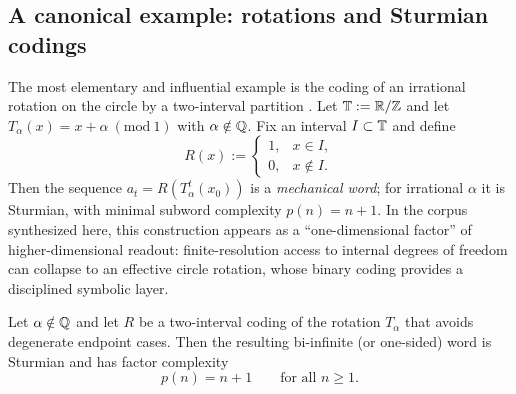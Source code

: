 \subsection{A canonical example: rotations and Sturmian codings}\label{sec:readout:sturmian}

The most elementary and influential example is the coding of an irrational rotation on the circle by a two-interval partition \cite{Queffelec2010}.
Let $\mathbb{T} := \mathbb{R}/\mathbb{Z}$ and let $T_\alpha(x)=x+\alpha \ (\mathrm{mod}\ 1)$ with $\alpha \notin \mathbb{Q}$. Fix an interval $I\subset \mathbb{T}$ and define
\[
R(x) :=
\begin{cases}
1,& x\in I,\\
0,& x\notin I.
\end{cases}
\]
Then the sequence $a_t = R(T_\alpha^t(x_0))$ is a \emph{mechanical word}; for irrational $\alpha$ it is Sturmian, with minimal subword complexity $p(n)=n+1$. In the corpus synthesized here, this construction appears as a ``one-dimensional factor'' of higher-dimensional readout: finite-resolution access to internal degrees of freedom can collapse to an effective circle rotation, whose binary coding provides a disciplined symbolic layer.

\begin{proposition}\label{prop:sturmian-complexity}
Let $\alpha\notin\mathbb{Q}$ and let $R$ be a two-interval coding of the rotation $T_\alpha$ that avoids degenerate endpoint cases. Then the resulting bi-infinite (or one-sided) word is Sturmian and has factor complexity
\[
p(n)=n+1\qquad\text{for all }n\ge 1.
\]
\cite{Queffelec2010,Lothaire2002}
\end{proposition}

